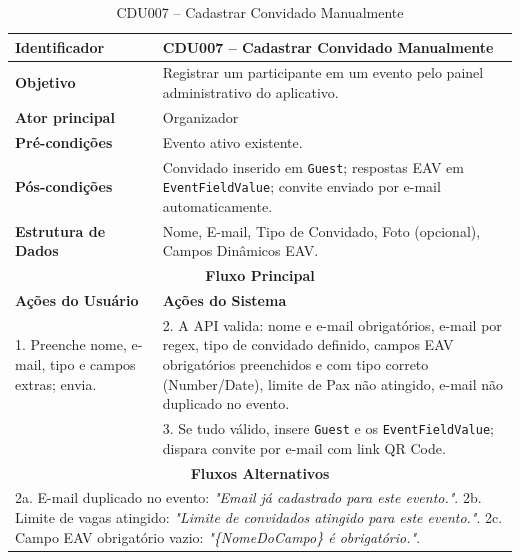 \begin{table}[htbp]
\centering
\caption{CDU007 – Cadastrar Convidado Manualmente}
\begin{tabular}{|p{4cm}|p{11cm}|}
\hline
\textbf{Identificador} & CDU007 – Cadastrar Convidado Manualmente \\ \hline
\textbf{Objetivo} & Registrar um participante em um evento pelo painel administrativo do aplicativo. \\ \hline
\textbf{Ator principal} & Organizador \\ \hline
\textbf{Pré-condições} & Evento ativo existente. \\ \hline
\textbf{Pós-condições} & Convidado inserido em \texttt{Guest}; respostas EAV em \texttt{EventFieldValue}; convite enviado por e-mail automaticamente. \\ \hline
\textbf{Estrutura de Dados} & Nome, E-mail, Tipo de Convidado, Foto (opcional), Campos Dinâmicos EAV. \\ \hline
\multicolumn{2}{|c|}{\textbf{Fluxo Principal}} \\ \hline
\textbf{Ações do Usuário} & \textbf{Ações do Sistema} \\ \hline
1. Preenche nome, e-mail, tipo e campos extras; envia. & 2. A API valida: nome e e-mail obrigatórios, e-mail por regex, tipo de convidado definido, campos EAV obrigatórios preenchidos e com tipo correto (Number/Date), limite de Pax não atingido, e-mail não duplicado no evento. \\ \hline
 & 3. Se tudo válido, insere \texttt{Guest} e os \texttt{EventFieldValue}; dispara convite por e-mail com link QR Code. \\ \hline
\multicolumn{2}{|c|}{\textbf{Fluxos Alternativos}} \\ \hline
\multicolumn{2}{|p{15cm}|}{2a. E-mail duplicado no evento: \textit{"Email já cadastrado para este evento."}. 2b. Limite de vagas atingido: \textit{"Limite de convidados atingido para este evento."}. 2c. Campo EAV obrigatório vazio: \textit{"\{NomeDoCampo\} é obrigatório."}.} \\ \hline
\end{tabular}
\end{table}


